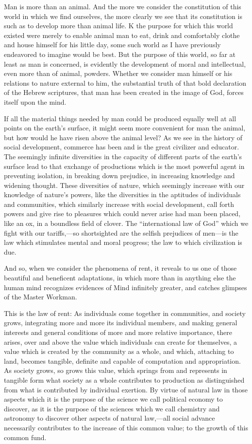 \documentclass{book}
\begin{document}
Man is more than an animal. And the more we consider the constitution of this world in which we find ourselves, the more clearly we see that its constitution is such as to develop more than animal life. K the purpose for which this world existed were merely to enable animal man to eat, drink and comfortably clothe and house himself for his little day, some such world as I have previously endeavored to imagine would be best. But the purpose of this world, so far at least as man is concerned, is evidently the development of moral and intellectual, even more than of animal, powders. Whether we consider man himself or his relations to nature external to him, the substantial truth of that bold declaration of the Hebrew scriptures, that man has been created in the image of God, forces itself upon the mind.

If all the material things needed by man could be produced equally well at all points on the earth’s surface, it might seem more convenient for man the animal, but how would he have risen above the animal level? As we see in the history of social development, commerce has been and is the great civilizer and educator. The seemingly infinite diversities in the capacity of different parts of the earth’s surface lead to that exchange of productions which is the most powerful agent in preventing isolation, in breaking down prejudice, in increasing knowledge and widening thought. These diversities of nature, which seemingly increase with our knowledge of nature’s powers, like the diversities in the aptitudes of individuals and communities, which similarly increase with social development, call forth powers and give rise to pleasures which could never arise had man been placed, like an ox, in a boundless field of clover. The “international law of God” which we fight with our tariffs,—so shortsighted are the selfish prejudices of men—is the law which stimulates mental and moral progress; the law to which civilization is due.

And so, when we consider the phenomena of rent, it reveals to us one of those beautiful and beneficent adaptations, in which more than in anything else the human mind recognizes evidences of Mind infinitely greater, and catches glimpses of the Master Workman.

This is the law of rent: As individuals come together in communities, and society grows, integrating more and more its individual members, and making general interests and general conditions of more and more relative importance, there arises, over and above the value which individuals can create for themselves, a value which is created by the community as a whole, and which, attaching to land, becomes tangible, definite and capable of computation and appropriation. As society grows, so grows this value, which springs from and represents in tangible form what society as a whole contributes to production as distinguished from what is contributed by individual exertion. By virtue of natural law in those aspects which it is the purpose of the science we call political economy to discover, as it is the purpose of the sciences which we call chemistry and astronomy to discover other aspects of natural law,—all social advance necessarily contributes to the increase of this common value; to the growth of this common fund.
\end{document}
